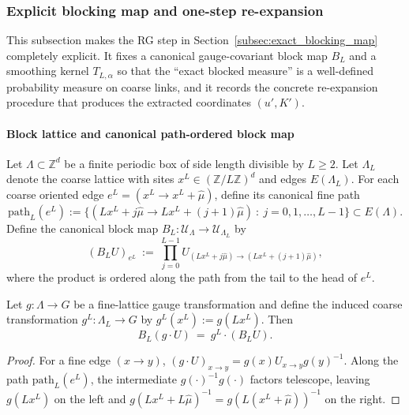 \subsubsection{Explicit blocking map and one-step re-expansion}
\label{subsec:hardened46_blocking_map}

This subsection makes the RG step in Section~\ref{subsec:exact_blocking_map} completely explicit.
It fixes a canonical gauge-covariant block map $B_L$ and a smoothing kernel $T_{L,\alpha}$ so that the ``exact blocked measure''
is a well-defined probability measure on coarse links, and it records the concrete re-expansion procedure that produces
the extracted coordinates $(u',K')$.

\paragraph*{Block lattice and canonical path-ordered block map}

Let $\Lambda\subset\mathbb Z^d$ be a finite periodic box of side length divisible by $L\ge2$.
Let $\Lambda_L$ denote the coarse lattice with sites $x^L\in(\mathbb Z/L\mathbb Z)^d$ and edges $E(\Lambda_L)$.
For each coarse oriented edge $e^L=(x^L\to x^L+\hat\mu)$, define its canonical fine path
\[
\mathrm{path}_L(e^L):=\bigl\{(Lx^L+j\hat\mu\to Lx^L+(j+1)\hat\mu)\ :\ j=0,1,\dots,L-1\bigr\}\subset E(\Lambda).
\]
Define the canonical block map $B_L:\mathcal U_\Lambda\to\mathcal U_{\Lambda_L}$ by
\begin{equation}\label{eq:h46_block_map}
(B_LU)_{e^L}\ :=\ \prod_{j=0}^{L-1} U_{(Lx^L+j\hat\mu)\to(Lx^L+(j+1)\hat\mu)},
\end{equation}
where the product is ordered along the path from the tail to the head of $e^L$.

\begin{lemma}\label{lem:h46_block_map_covariant}
Let $g:\Lambda\to G$ be a fine-lattice gauge transformation and define the induced coarse transformation $g^L:\Lambda_L\to G$
by $g^L(x^L):=g(Lx^L)$. Then
\[
B_L(g\cdot U)\ =\ g^L\cdot (B_LU).
\]
\end{lemma}

\begin{proof}
For a fine edge $(x\to y)$, $(g\cdot U)_{x\to y}=g(x)U_{x\to y}g(y)^{-1}$.
Along the path $\mathrm{path}_L(e^L)$, the intermediate $g(\cdot)^{-1}g(\cdot)$ factors telescope, leaving
$g(Lx^L)$ on the left and $g(Lx^L+L\hat\mu)^{-1}=g(L(x^L+\hat\mu))^{-1}$ on the right.
\end{proof}

